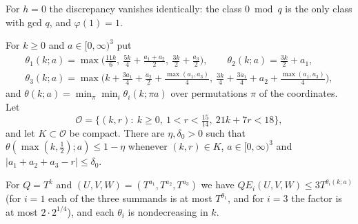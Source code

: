 \documentclass[11pt,colorlinks]{charlie}
\begin{document}
\begin{remark}
For $h=0$ the discrepancy vanishes identically: the class $0\bmod q$ is the only class with gcd $q$, and $\varphi(1)=1$.
\end{remark}

\begin{lemma}[Exponents]\label{lem:exponents}
For $k\ge0$ and $a\in[0,\infty)^3$ put
\begin{gather*}
 \theta_1(k;a)=\max\big(\tfrac{11k}6,\ \tfrac{5k}4+\tfrac{a_1+a_2}2,\ \tfrac{3k}2+\tfrac{a_3}2\big),\qquad\theta_2(k;a)=\tfrac{3k}2+a_1,\\
 \theta_3(k;a)=\max\big(k+\tfrac{3a_1}4+\tfrac{a_2}2+\tfrac{\max(a_1,a_3)}4,\ \tfrac{3k}4+\tfrac{3a_1}4+a_2+\tfrac{\max(a_1,a_3)}4\big),
\end{gather*}
and $\theta(k;a)=\min_\pi\min_i\theta_i(k;\pi a)$ over permutations $\pi$ of the coordinates. Let
\[
 \mathcal O=\{(k,r):\ k\ge0,\ 1<r<\tfrac{15}{14},\ 21k+7r<18\},
\]
and let $K\subset\mathcal O$ be compact. There are $\eta,\delta_0>0$ such that $\theta(\max(k,\frac12);a)\le1-\eta$ whenever $(k,r)\in K$, $a\in[0,\infty)^3$ and $|a_1+a_2+a_3-r|\le\delta_0$.
\end{lemma}
For $Q=T^k$ and $(U,V,W)=(T^{a_1},T^{a_2},T^{a_3})$ we have $QE_i(U,V,W)\le3T^{\theta_i(k;a)}$ (for $i=1$ each of the three summands is at most $T^{\theta_1}$, and for $i=3$ the factor is at most $2\cdot2^{1/4}$), and each $\theta_i$ is nondecreasing in $k$.
\end{document}

